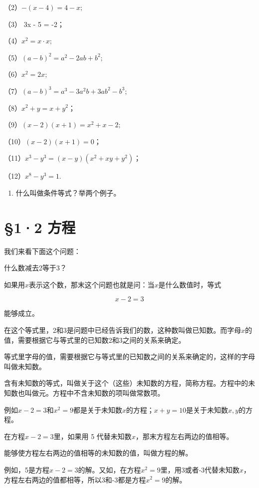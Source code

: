 （2）\(-(x - 4) = 4 - x;\)

（3） 3x - 5 = -2；

（4）\(x^{2} = x\cdot x;\)

（5）\((a - b)^{2} = a^{2} - 2ab + b^{2};\)

（6）\(x^{2} = 2x;\)

（7）\((a - b)^{3} = a^{3} - 3a^{2}b + 3ab^{2} - b^{3};\)

（8）\(x^{2} + y = x + y^{2}\)；

（9）\((x - 2)(x + 1) = x^2 + x - 2;\)

（10）\((x - 2)(x + 1) = 0\)；

（11）\(x^{3} - y^{3} = (x - y)(x^{2} + xy + y^{2})\)；

（12）\(x^{8} - y^{3} = 1.\)

\begin{enumerate}[start=4]
\item
  什么叫做条件等式？举两个例子。
\end{enumerate}

\section{§1·2 方程}

我们来看下面这个问题：

什么数减去2等于3？

如果用\(x\)表示这个数，那末这个问题也就是问：当\(x\)是什么数值时，等式

\[
x - 2 = 3
\]

能够成立。

在这个等式里，2和3是问题中已经告诉我们的数，这种数叫做已知数。而字母\(x\)的值，需要根据它与等式里的已知数2和3之间的关系来确定。

等式里字母的值，需要根据它与等式里的已知数之间的关系来确定的，这样的字母叫做未知数。

含有未知数的等式，叫做关于这个（这些）未知数的方程，简称方程。方程中的未知数也叫做元。方程中不含未知数的项叫做常数项。

例如\(x - 2 = 3\)和\(x^2 = 9\)都是关于未知数\(x\)的方程；\(x + y = 10\)是关于未知数\(x, y\)的方程。

在方程\(x - 2 = 3\)里，如果用 5
代替未知数\(x\)，那末方程左右两边的值相等。

能够使方程左右两边的值相等的未知数的值，叫做方程的解。

例如，5是方程\(x - 2 = 3\)的解。又如，在方程\(x^{2} = 9\)里，用3或者-3代替未知数\(x\)，方程左右两边的值都相等，所以3和-3都是方程\(x^{2} = 9\)的解。

